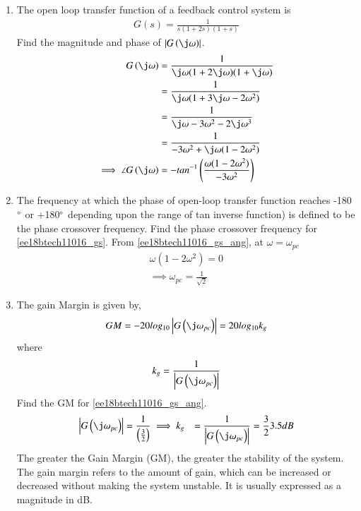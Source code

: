\begin{enumerate}[label=\thesection.\arabic*.,ref=\thesection.\theenumi]
\item The open loop transfer function of a feedback control system is  
\begin{align}
G(s) = \frac{1}{s(1+2s)(1+s)} 
\label{ee18btech11016_gs}
\end{align}
%
Find the magnitude and phase of $\abs{G\brak{\j\omega}}$.
\\
\solution
\begin{align}
G\brak{\j\omega} &= \frac{1}{\j\omega(1+2\j\omega)(1+\j\omega)} 
\\
 &= \frac{1}{\j\omega(1+3\j\omega-2\omega^2)}
\\
&=\frac{1}{\j\omega-3\omega^2-2\j\omega^3}
\\
 &= \frac{1}{-3\omega^2+\j\omega(1-2\omega^2)} 
\\
\implies \angle G\brak{\j\omega}&=- tan^{-1}\brak{\frac{\omega(1-2\omega^2)}{-3\omega^2}}
\label{ee18btech11016_gs_ang}
\end{align}
%
\item The frequency at which the phase of open-loop transfer function reaches -180$\degree$ or +180$\degree$ depending upon the range of tan inverse function) is defined to be the phase crossover frequency.  Find the phase crossover frequency for  \eqref{ee18btech11016_gs}.
\solution From \eqref{ee18btech11016_gs_ang}, at $\omega=\omega_{pc}$ 
\begin{align}
\omega(1-2\omega^2) = 0 
\\
\implies \omega_{pc} = \frac{1}{\sqrt{2}} 
\end{align}
\item The gain Margin is given by,
\begin{align}
GM = -20log_{10}\abs{G\brak{\j\omega_{pc}}} = 20log_{10}k_{g}
\end{align}
where 
\begin{align}
k_{g}=\frac{1}{\abs{G\brak{\j\omega_{pc}}}} 
\end{align}
%
Find the GM for \eqref{ee18btech11016_gs_ang}.
\\
\solution 
\begin{align}
\abs{G\brak{\j\omega_{pc}}} &= \frac{1}{\brak{\frac{3}{2}}}
\implies k_{g}&=\frac{1}{\abs{G\brak{\j\omega_{pc}}}} = \frac{3}{2}
3.5dB
\end{align}
The greater the Gain Margin (GM), the greater the stability of the system. The gain margin refers to the amount of gain, which can be increased or decreased without making the system unstable. It is usually expressed as a magnitude in dB.

\end{enumerate}
